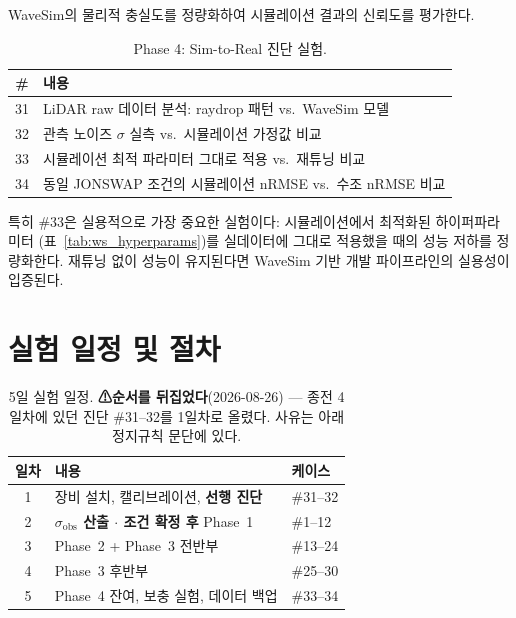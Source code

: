 \documentclass[11pt]{report}
\numberwithin{equation}{chapter}
\numberwithin{figure}{chapter}
\numberwithin{table}{chapter}
\begin{document}
WaveSim의 물리적 충실도를 정량화하여 시뮬레이션 결과의 신뢰도를 평가한다.

\begin{table}[H]
\centering
\caption{Phase 4: Sim-to-Real 진단 실험.}
\label{tab:tank_phase4}
\begin{tabular}{cl}
\toprule
\# & 내용 \\
\midrule
31 & LiDAR raw 데이터 분석: raydrop 패턴 vs.\ WaveSim 모델 \\
32 & 관측 노이즈 $\sigma$ 실측 vs.\ 시뮬레이션 가정값 비교 \\
33 & 시뮬레이션 최적 파라미터 그대로 적용 vs.\ 재튜닝 비교 \\
34 & 동일 JONSWAP 조건의 시뮬레이션 nRMSE vs.\ 수조 nRMSE 비교 \\
\bottomrule
\end{tabular}
\end{table}

특히 \#33은 실용적으로 가장 중요한 실험이다:
시뮬레이션에서 최적화된 하이퍼파라미터
(표~\ref{tab:ws_hyperparams})를 실데이터에 그대로 적용했을 때의 성능 저하를 정량화한다.
재튜닝 없이 성능이 유지된다면 WaveSim 기반 개발 파이프라인의 실용성이 입증된다.

\section{실험 일정 및 절차}
\label{sec:tank_schedule}

\begin{table}[H]
\centering
\caption{5일 실험 일정. \textbf{⚠순서를 뒤집었다}(2026-08-26) ---
  종전 4일차에 있던 진단 \#31--32를 1일차로 올렸다.
  사유는 아래 정지규칙 문단에 있다.}
\label{tab:tank_schedule}
\begin{tabular}{cll}
\toprule
일차 & 내용 & 케이스 \\
\midrule
1 & 장비 설치, 캘리브레이션, \textbf{선행 진단} & \#31--32 \\
2 & \textbf{$\sigma_{\text{obs}}$ 산출 $\cdot$ 조건 확정 후} Phase~1 & \#1--12 \\
3 & Phase~2 + Phase~3 전반부 & \#13--24 \\
4 & Phase~3 후반부 & \#25--30 \\
5 & Phase~4 잔여, 보충 실험, 데이터 백업 & \#33--34 \\
\bottomrule
\end{tabular}
\end{table}
\end{document}
